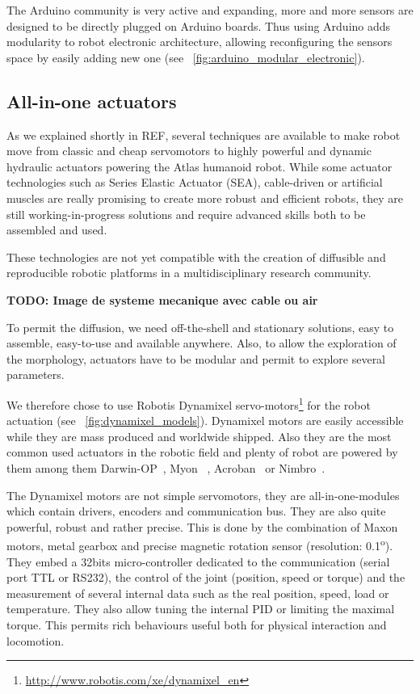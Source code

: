 The Arduino community is very active and expanding, more and more sensors are designed to be directly plugged on Arduino boards. Thus using Arduino adds modularity to robot electronic architecture, allowing reconfiguring the sensors space by easily adding new one (see \figurename~\ref{fig:arduino_modular_electronic}).




\subsection{All-in-one actuators} %

As we explained shortly in REF, several techniques are available to make robot move from classic and cheap servomotors to highly powerful and dynamic hydraulic actuators powering the Atlas humanoid robot.
While some actuator technologies such as Series Elastic Actuator (SEA), cable-driven or artificial muscles are really promising to create more robust and efficient robots, they are still working-in-progress solutions and require advanced skills both to be assembled and used.

These technologies are not yet compatible with the creation of diffusible and reproducible robotic platforms in a multidisciplinary research community.


\textbf{TODO: Image de systeme mecanique avec cable ou air }

To permit the diffusion, we need off-the-shell and stationary solutions, easy to assemble, easy-to-use and available anywhere. Also, to allow the exploration of the morphology, actuators have to be modular and permit to explore several parameters.

We therefore chose to use Robotis Dynamixel servo-motors\footnote{\url{http://www.robotis.com/xe/dynamixel_en}} for the robot actuation (see \figurename~\ref{fig:dynamixel_models}). Dynamixel motors are easily accessible while they are mass produced and worldwide shipped. Also they are the most common used actuators in the robotic field and plenty of robot are powered by them among them Darwin-OP~\cite{REF}, Myon~\cite{REF} , Acroban~\cite{REF} or Nimbro~\cite{REF}.

The Dynamixel motors are not simple servomotors, they are all-in-one-modules which contain drivers, encoders and communication bus. They are also quite powerful, robust and rather precise. This is done by the combination of Maxon motors, metal gearbox and precise magnetic rotation sensor (resolution: 0.1\textsuperscript{o}). They embed a 32bits micro-controller dedicated to the communication (serial port TTL or RS232), the control of the joint (position, speed or torque) and the measurement of several internal data such as the real position, speed, load or temperature. They also allow tuning the internal PID or limiting the maximal torque. This permits rich behaviours useful both for physical interaction and locomotion.


